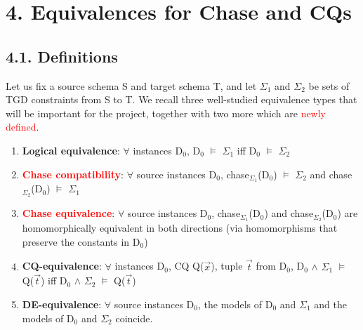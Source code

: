 \documentclass[11pt, a4paper, dvipsnames]{article}
\begin{document}
\newpage

\section{4. Equivalences for Chase and CQs}
\subsection{4.1. Definitions}
Let us fix a source schema S and target schema T, and let $\Sigma_{1}$ and $\Sigma_{2}$ be sets of TGD constraints from S to T. We recall three well-studied equivalence types\cite{equivalence} that will be important for the project, together with two more which are \textcolor{red}{newly defined}. 
\begin{enumerate}
	\item \textbf{Logical equivalence}: $\forall$ instances D$_{0}$, D$_{0}$ $\vDash$ $\Sigma_{1}$ iff D$_{0}$ $\vDash$ $\Sigma_{2}$
	\item \textcolor{red}{\textbf{Chase compatibility}}: $\forall$ source instances D$_{0}$, chase$_{\Sigma_{1}}$(D$_{0}$) $\vDash$ $\Sigma_{2}$ and \newline chase$_{\Sigma_{2}}$(D$_{0}$) $\vDash$ $\Sigma_{1}$
	\item \textcolor{red}{\textbf{Chase equivalence}}: $\forall$ source instances D$_{0}$, chase$_{\Sigma_{1}}$(D$_{0}$) and chase$_{\Sigma_{2}}$(D$_{0}$) are homomorphically equivalent in both directions (via homomorphisms that preserve the constants in D$_{0}$)
	\item \textbf{CQ-equivalence}: $\forall$ instances D$_{0}$, CQ Q($\vec{x}$), tuple $\vec{t}$ from D$_{0}$, D$_{0}$ $\wedge$ $\Sigma_{1}$ $\vDash$ Q($\vec{t}$) iff D$_{0}$ $\wedge$ $\Sigma_{2}$ $\vDash$ Q($\vec{t}$)
	\item \textbf{DE-equivalence}: $\forall$ source instances D$_{0}$, the models of D$_{0}$ and $\Sigma_{1}$ and the models of D$_{0}$ and $\Sigma_{2}$ coincide.
\end{enumerate}
\end{document}
